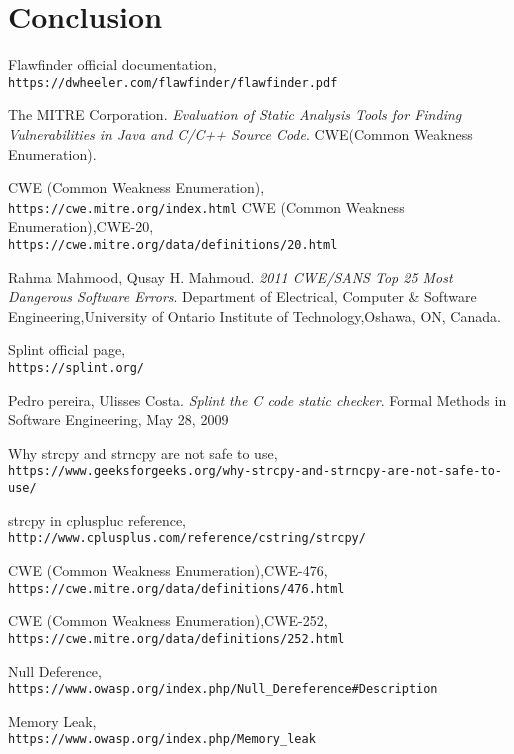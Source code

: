 \documentclass[a4paper,12pt]{article}
\begin{document}
\section{Conclusion}








\begin{thebibliography}{}

   Flawfinder official documentation,\\\texttt{https://dwheeler.com/flawfinder/flawfinder.pdf}

The MITRE Corporation.
\textit{Evaluation of Static Analysis Tools for Finding Vulnerabilities in Java and C/C++
Source Code}.
CWE(Common
Weakness Enumeration)\cite{CWE}.

  CWE (Common
Weakness Enumeration),\\\texttt{https://cwe.mitre.org/index.html}
  CWE (Common
Weakness Enumeration),CWE-20,\\\texttt{https://cwe.mitre.org/data/definitions/20.html}
  
Rahma Mahmood, Qusay H. Mahmoud.
\textit{2011 CWE/SANS Top 25 Most Dangerous Software Errors}.
Department of Electrical, Computer \& Software Engineering,University of Ontario Institute of Technology,Oshawa, ON, Canada.

 Splint official page,\\\texttt{https://splint.org/}    

Pedro pereira, Ulisses Costa.
\textit{Splint the C code static checker}.
Formal Methods in Software Engineering, May 28, 2009

Why strcpy and strncpy are not safe to use,\\\texttt{https://www.geeksforgeeks.org/why-strcpy-and-strncpy-are-not-safe-to-use/}


strcpy in cpluspluc reference,\\\texttt{http://www.cplusplus.com/reference/cstring/strcpy/}
 
  CWE (Common
Weakness Enumeration),CWE-476,\\\texttt{https://cwe.mitre.org/data/definitions/476.html}

  CWE (Common
Weakness Enumeration),CWE-252,\\\texttt{https://cwe.mitre.org/data/definitions/252.html}

  Null Deference,\\\texttt{https://www.owasp.org/index.php/Null\_Dereference\#Description}

  Memory Leak,\\\texttt{https://www.owasp.org/index.php/Memory\_leak}

\end{thebibliography}
\end{document}
